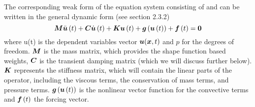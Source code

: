 The corresponding weak form of the equation system consisting of  and  can be written in the general dynamic form (see section 2.3.2)
\begin{equation}
  \matr{M}\fnof{\ddot{\vect{u}}}{t}+\matr{C}\fnof{\dot{\vect{u}}}{t}+\matr{K}\fnof{\vect{u}}{t}+
  \fnof{\vect{g}}{\fnof{\vect{u}}{t}}+\fnof{\vect{f}}{t}=\vect{0}
  \label{eqn:generaldynamicnonlinear}
\end{equation}
where u(t) is the dependent variables vector $\vect{u}(\vect{x},t)$ and $p$ for the degrees of freedom. $\matr{M}$ is the mass matrix, which provides the shape function based weights, $\matr{C}$ is the transient damping matrix (which we will discuss further below). $\matr{K}$ represents the stiffness matrix, which will contain the linear parts of the operator, including the viscous terms, the conservation of mass terms, and pressure terms. $\fnof{\vect{g}}{\fnof{\vect{u}}{t}}$ is the nonlinear vector function for the convective terms and $\fnof{\vect{f}}{t}$ the forcing vector. 

